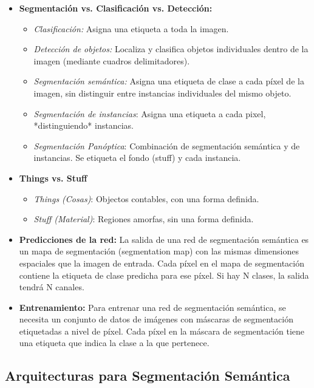 \documentclass{article}
\begin{document}
\begin{itemize}
    \item \textbf{Segmentación vs. Clasificación vs. Detección:}
        \begin{itemize}
            \item \textit{Clasificación:} Asigna una etiqueta a toda la imagen.
            \item \textit{Detección de objetos:} Localiza y clasifica objetos individuales dentro de la imagen (mediante cuadros delimitadores).
            \item \textit{Segmentación semántica:} Asigna una etiqueta de clase a cada píxel de la imagen, sin distinguir entre instancias individuales del mismo objeto.
            \item \textit{Segmentación de instancias}: Asigna una etiqueta a cada pixel, *distinguiendo* instancias.
            \item \textit{Segmentación Panóptica}: Combinación de segmentación semántica y de instancias. Se etiqueta el fondo (stuff) y cada instancia.
        \end{itemize}
     \item \textbf{Things vs. Stuff}
        \begin{itemize}
        	\item \textit{Things (Cosas)}: Objectos contables, con una forma definida.
        	\item \textit{Stuff (Material)}: Regiones amorfas, sin una forma definida.
        \end{itemize}
    \item \textbf{Predicciones de la red:} La salida de una red de segmentación semántica es un mapa de segmentación (segmentation map) con las mismas dimensiones espaciales que la imagen de entrada.  Cada píxel en el mapa de segmentación contiene la etiqueta de clase predicha para ese píxel. Si hay N clases, la salida tendrá N canales.
    \item \textbf{Entrenamiento:} Para entrenar una red de segmentación semántica, se necesita un conjunto de datos de imágenes con máscaras de segmentación etiquetadas a nivel de píxel. Cada píxel en la máscara de segmentación tiene una etiqueta que indica la clase a la que pertenece.
\end{itemize}

\subsection{Arquitecturas para Segmentación Semántica}
\end{document}
